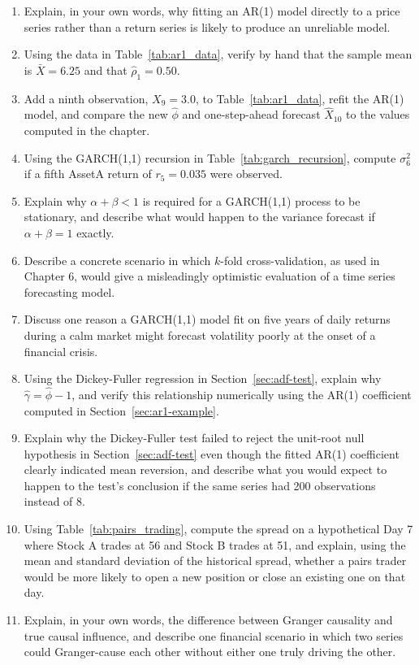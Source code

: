 \documentclass[../ai_in_finance]{subfiles}
\begin{document}
\begin{enumerate}
    \item Explain, in your own words, why fitting an AR(1) model directly to a price series rather than a return series is likely to produce an unreliable model.
    \item Using the data in Table~\ref{tab:ar1_data}, verify by hand that the sample mean is $\bar X = 6.25$ and that $\hat\rho_1 = 0.50$.
    \item Add a ninth observation, $X_9 = 3.0$, to Table~\ref{tab:ar1_data}, refit the AR(1) model, and compare the new $\hat\phi$ and one-step-ahead forecast $\hat X_{10}$ to the values computed in the chapter.
    \item Using the GARCH(1,1) recursion in Table~\ref{tab:garch_recursion}, compute $\sigma_6^2$ if a fifth AssetA return of $r_5 = 0.035$ were observed.
    \item Explain why $\alpha + \beta < 1$ is required for a GARCH(1,1) process to be stationary, and describe what would happen to the variance forecast if $\alpha + \beta = 1$ exactly.
    \item Describe a concrete scenario in which $k$-fold cross-validation, as used in Chapter 6, would give a misleadingly optimistic evaluation of a time series forecasting model.
    \item Discuss one reason a GARCH(1,1) model fit on five years of daily returns during a calm market might forecast volatility poorly at the onset of a financial crisis.
    \item Using the Dickey-Fuller regression in Section~\ref{sec:adf-test}, explain why $\hat\gamma = \hat\phi - 1$, and verify this relationship numerically using the AR(1) coefficient computed in Section~\ref{sec:ar1-example}.
    \item Explain why the Dickey-Fuller test failed to reject the unit-root null hypothesis in Section~\ref{sec:adf-test} even though the fitted AR(1) coefficient clearly indicated mean reversion, and describe what you would expect to happen to the test's conclusion if the same series had 200 observations instead of 8.
    \item Using Table~\ref{tab:pairs_trading}, compute the spread on a hypothetical Day 7 where Stock A trades at 56 and Stock B trades at 51, and explain, using the mean and standard deviation of the historical spread, whether a pairs trader would be more likely to open a new position or close an existing one on that day.
    \item Explain, in your own words, the difference between Granger causality and true causal influence, and describe one financial scenario in which two series could Granger-cause each other without either one truly driving the other.

\end{enumerate}
\end{document}
